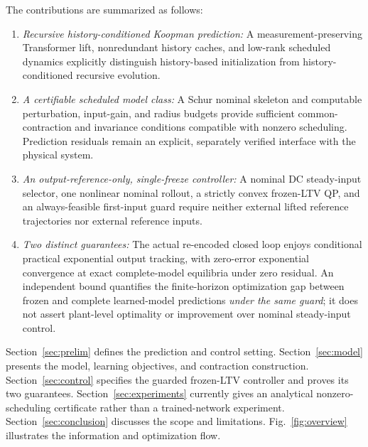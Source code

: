 \documentclass[journal]{IEEEtran}
\theoremstyle{plain}
\theoremstyle{definition}
\begin{document}
The contributions are summarized as follows:
\begin{enumerate}
\item \emph{Recursive history-conditioned Koopman prediction:} A measurement-preserving Transformer lift, nonredundant history caches, and low-rank scheduled dynamics explicitly distinguish history-based initialization from history-conditioned recursive evolution.
\item \emph{A certifiable scheduled model class:} A Schur nominal skeleton and computable perturbation, input-gain, and radius budgets provide sufficient common-contraction and invariance conditions compatible with nonzero scheduling. Prediction residuals remain an explicit, separately verified interface with the physical system.
\item \emph{An output-reference-only, single-freeze controller:} A nominal DC steady-input selector, one nonlinear nominal rollout, a strictly convex frozen-LTV QP, and an always-feasible first-input guard require neither external lifted reference trajectories nor external reference inputs.
\item \emph{Two distinct guarantees:} The actual re-encoded closed loop enjoys conditional practical exponential output tracking, with zero-error exponential convergence at exact complete-model equilibria under zero residual. An independent bound quantifies the finite-horizon optimization gap between frozen and complete learned-model predictions \emph{under the same guard}; it does not assert plant-level optimality or improvement over nominal steady-input control.
\end{enumerate}

Section~\ref{sec:prelim} defines the prediction and control setting. Section~\ref{sec:model} presents the model, learning objectives, and contraction construction. Section~\ref{sec:control} specifies the guarded frozen-LTV controller and proves its two guarantees. Section~\ref{sec:experiments} currently gives an analytical nonzero-scheduling certificate rather than a trained-network experiment. Section~\ref{sec:conclusion} discusses the scope and limitations. Fig.~\ref{fig:overview} illustrates the information and optimization flow.
\end{document}
